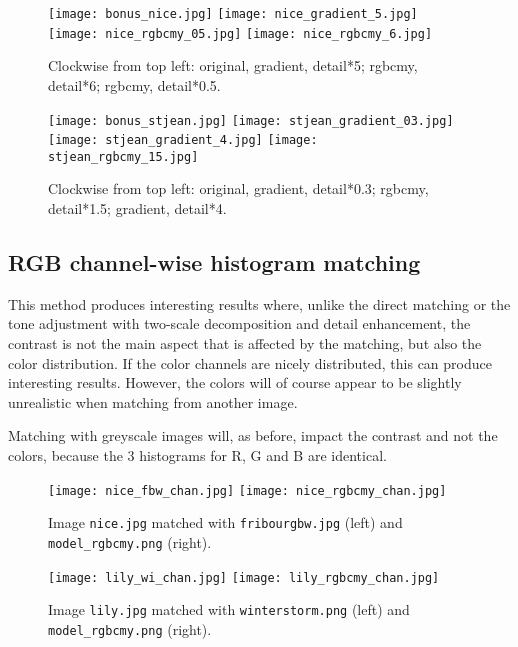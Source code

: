 \documentclass[11pt,a4paper]{article}
\begin{document}
\begin{figure}[h]
    \begin{center}
    	\texttt{[image: bonus\_nice.jpg]}
    	\texttt{[image: nice\_gradient\_5.jpg]}
    	\texttt{[image: nice\_rgbcmy\_05.jpg]}
    	\texttt{[image: nice\_rgbcmy\_6.jpg]}
        \caption{Clockwise from top left: original, gradient, detail*5; rgbcmy, detail*6; rgbcmy, detail*0.5.}
    \end{center}
\end{figure}

\begin{figure}[h]
    \begin{center}
    	\texttt{[image: bonus\_stjean.jpg]}
    	\texttt{[image: stjean\_gradient\_03.jpg]}
    	\texttt{[image: stjean\_gradient\_4.jpg]}
    	\texttt{[image: stjean\_rgbcmy\_15.jpg]}
        \caption{Clockwise from top left: original, gradient, detail*0.3; rgbcmy, detail*1.5; gradient, detail*4.}
    \end{center}
\end{figure}


\newpage
\FloatBarrier
\subsection*{RGB channel-wise histogram matching}
This method produces interesting results where, unlike the direct matching or the tone adjustment with two-scale decomposition and detail enhancement, the contrast is not the main aspect that is affected by the matching, but also the color distribution. If the color channels are nicely distributed, this can produce interesting results. However, the colors will of course appear to be slightly unrealistic when matching from another image.

Matching with greyscale images will, as before, impact the contrast and not the colors, because the 3 histograms for R, G and B are identical.

\begin{figure}[htb]
    \begin{center}
    	\texttt{[image: nice\_fbw\_chan.jpg]}
        \texttt{[image: nice\_rgbcmy\_chan.jpg]}
        \caption{Image \texttt{nice.jpg} matched with \texttt{fribourgbw.jpg} (left) and \texttt{model\_rgbcmy.png} (right).}
    \end{center}
\end{figure}

\begin{figure}[htb]
    \begin{center}
    	\texttt{[image: lily\_wi\_chan.jpg]}
        \texttt{[image: lily\_rgbcmy\_chan.jpg]}
        \caption{Image \texttt{lily.jpg} matched with \texttt{winterstorm.png} (left) and \texttt{model\_rgbcmy.png} (right).}
    \end{center}
\end{figure}

\end{document}
